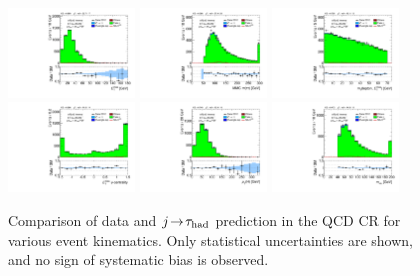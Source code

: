 \begin{figure}[!htpb]
  \includegraphics[width=0.30\textwidth]{figures/analysis/vbf-QCDCR/met-pt-hi}
  \includegraphics[width=0.30\textwidth]{figures/analysis/vbf-QCDCR/mMMC}
  \includegraphics[width=0.30\textwidth]{figures/analysis/vbf-QCDCR/mT} \\
  \includegraphics[width=0.30\textwidth]{figures/analysis/vbf-QCDCR/met-phi-centrality}
  \includegraphics[width=0.30\textwidth]{figures/analysis/vbf-QCDCR/H-pt-hi}
  \includegraphics[width=0.30\textwidth]{figures/analysis/vbf-QCDCR/mvis} \\
  \caption{Comparison of data and $j\!\rightarrow\!\tau_\text{had}$ prediction in the QCD CR for various event kinematics. Only statistical uncertainties are shown, and no sign of systematic bias is observed.}
  \label{fig:backgrounds-QCDCR-taus}
\end{figure}

